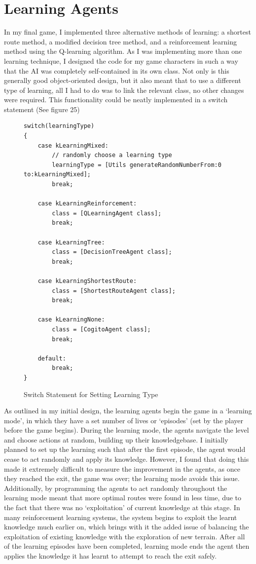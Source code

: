 \documentclass[a4paper,oneside]{report}
\begin{document}
\section{Learning Agents}

In my final game, I implemented three alternative methods of learning: a shortest route method, a modified decision tree method, and a reinforcement learning method using the Q-learning algorithm. As I was implementing more than one learning technique, I designed the code for my game characters in such a way that the AI was completely self-contained in its own class. Not only is this generally good object-oriented design, but it also meant that to use a different type of learning, all I had to do was to link the relevant class, no other changes were required. This functionality could be neatly implemented in a switch statement (See figure 25)

\begin{figure}[h!]
\begin{lstlisting}
switch(learningType) 
{                
	case kLearningMixed:
    	// randomly choose a learning type
        learningType = [Utils generateRandomNumberFrom:0 to:kLearningMixed]; 
        break;
                
    case kLearningReinforcement:
        class = [QLearningAgent class];
        break;
                
    case kLearningTree:
        class = [DecisionTreeAgent class];
        break;
                
    case kLearningShortestRoute:
        class = [ShortestRouteAgent class];
        break;
         
    case kLearningNone:
        class = [CogitoAgent class];
        break;
                
    default:
        break;
}
\end{lstlisting}
\caption{Switch Statement for Setting Learning Type}
\end{figure}

As outlined in my initial design, the learning agents begin the game in a `learning mode', in which they have a set number of lives or `episodes' (set by the player before the game begins). During the learning mode, the agents navigate the level and choose actions at random, building up their knowledgebase. I initially planned to set up the learning such that after the first episode, the agent would cease to act randomly and apply its knowledge. However, I found that doing this made it extremely difficult to measure the improvement in the agents, as once they reached the exit, the game was over; the learning mode avoids this issue. Additionally, by programming the agents to act randomly throughout the learning mode meant that more optimal routes were found in less time, due to the fact that there was no `exploitation' of current knowledge at this stage. In many reinforcement learning systems, the system begins to exploit the learnt knowledge much earlier on, which brings with it the added issue of balancing the exploitation of existing knowledge with the exploration of new terrain. After all of the learning episodes have been completed, learning mode ends the agent then applies the knowledge it has learnt to attempt to reach the exit safely.
\end{document}
